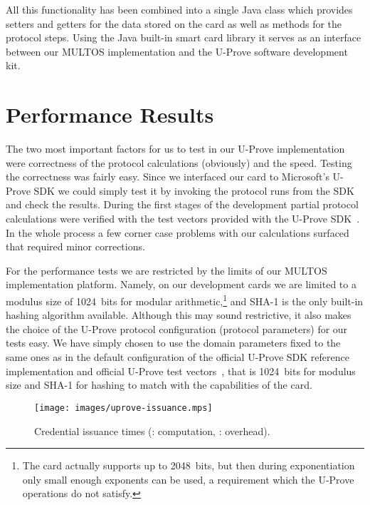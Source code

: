 All this functionality has been combined into a single Java class which provides
setters and getters for the data stored on the card as well as methods for the
protocol steps. Using the Java built-in smart card library it serves as an
interface between our MULTOS implementation and the U-Prove software development
kit.

\section{Performance Results\label{sec:UP-performance}}

The two most important factors for us to test in our U-Prove implementation were
correctness of the protocol calculations (obviously) and the speed. Testing the
correctness was fairly easy. Since we interfaced our card to Microsoft's U-Prove
SDK we could simply test it by invoking the protocol runs from the SDK and check
the results. During the first stages of the development partial protocol
calculations were verified with the test vectors provided with the U-Prove
SDK~\cite{U-Prove_Vectors2011}. In the whole process a few corner case problems
with our calculations surfaced that required minor corrections.

For the performance tests we are restricted by the limits of our MULTOS
implementation platform. Namely, on our development cards we are limited to a
modulus size of 1024~bits for modular arithmetic,\footnote{The card actually
supports up to 2048~bits, but then during exponentiation only small enough
exponents can be used, a requirement which the U-Prove operations do not
satisfy.} and SHA-1 is the only built-in hashing algorithm available. Although
this may sound restrictive, it also makes the choice of the U-Prove protocol
configuration (protocol parameters) for our tests easy. We have simply chosen to
use the domain parameters fixed to the same ones as in the default configuration
of the official U-Prove SDK reference implementation and official U-Prove test
vectors~\cite{U-Prove_Vectors2011}, that is 1024~bits for modulus size and SHA-1
for hashing to match with the capabilities of the card.

\begin{figure}
  \centering
  \texttt{[image: images/uprove-issuance.mps]}
  \caption[Credential issuance times.]{
    Credential issuance times
    (: computation,
      : overhead).}
  \label{fig:issue}
\end{figure}

